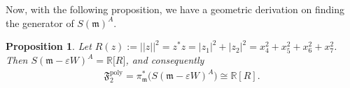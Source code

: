 \documentclass[11pt]{amsart}
\newtheorem{proposition}[theorem]{Proposition}
\theoremstyle{definition}
\theoremstyle{plain}
\theoremstyle{conclusion}
\begin{document}


 Now, with the following proposition, we have a geometric derivation on finding the generator of $S(\mathfrak{m})^A$.

\begin{proposition} 
\label{prop:F2bracket}
 Let $R(z):=||z||^2=z^* z=|z_1|^2+|z_2|^2 = x_4^2 + x_5^2 + x_6^2 + x_7^2 $. Then  $S(\mathfrak{m}-\varepsilon W)^A=\mathbb{R}\bigl[R\bigr]$, and consequently
\begin{align*}
\mathfrak{F}_2^{\mathrm{poly}}=\pi_{\mathfrak{m}}^*\bigl(S(\mathfrak{m}-\varepsilon W)^A\bigr)\cong \mathbb{R}[R].
\end{align*}
\end{proposition}
\end{document}
